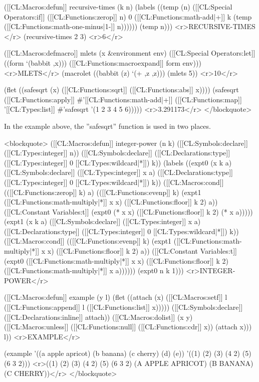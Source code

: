 ([[CL:Macros:defun]] recursive-times (k n) 
  (labels ((temp (n) ([[CL:Special Operators:if]] ([[CL:Functions:zerop]] n) 0 ([[CL:Functions:math-add|+]] k (temp ([[CL:Functions:math-one-minus|1-]] n))))))
    (temp n))) <r>RECURSIVE-TIMES </r>
(recursive-times 2 3) <r>6</r>

([[CL:Macros:defmacro]] mlets (x &environment env)
  ([[CL:Special Operators:let]] ((form `(babbit ,x)))
    ([[CL:Functions:macroexpand]] form env))) <r>MLETS</r>
(macrolet ((babbit (z) `(+ ,z ,z)))
  (mlets 5)) <r>10</r>

(flet ((safesqrt (x) ([[CL:Functions:sqrt]] ([[CL:Functions:abs]] x))))
  (safesqrt ([[CL:Functions:apply]] #'[[CL:Functions:math-add|+]] ([[CL:Functions:map]] '[[CL:Types:list]] #'safesqrt '(1 2 3 4 5 6))))) <r>3.291173</r>
</blockquote>

In the example above, the ''safesqrt'' function is used in two places. 

<blockquote>
([[CL:Macros:defun]] integer-power (n k)
  ([[CL:Symbols:declare]] ([[CL:Types:integer]] n))
  ([[CL:Symbols:declare]] ([[CL:Declarations:type]] ([[CL:Types:integer]] 0 [[CL:Types:wildcard|*]]) k))
  (labels ((expt0 (x k a)
             ([[CL:Symbols:declare]] ([[CL:Types:integer]] x a) ([[CL:Declarations:type]] ([[CL:Types:integer]] 0 [[CL:Types:wildcard|*]]) k))
             ([[CL:Macros:cond]] (([[CL:Functions:zerop]] k) a)
                   (([[CL:Functions:evenp]] k) (expt1 ([[CL:Functions:math-multiply|*]] x x) ([[CL:Functions:floor]] k 2) a))
                   ([[CL:Constant Variables:t]] (expt0 (* x x) ([[CL:Functions:floor]] k 2) (* x a)))))
           (expt1 (x k a)
             ([[CL:Symbols:declare]] ([[CL:Types:integer]] x a) ([[CL:Declarations:type]] ([[CL:Types:integer]] 0 [[CL:Types:wildcard|*]]) k))
             ([[CL:Macros:cond]] (([[CL:Functions:evenp]] k) (expt1 ([[CL:Functions:math-multiply|*]] x x) ([[CL:Functions:floor]] k 2) a))
                    ([[CL:Constant Variables:t]] (expt0 ([[CL:Functions:math-multiply|*]] x x) ([[CL:Functions:floor]] k 2) ([[CL:Functions:math-multiply|*]] x a))))))
  (expt0 n k 1))) <r>INTEGER-POWER</r>

([[CL:Macros:defun]] example (y l)
  (flet ((attach (x) ([[CL:Macros:setf]] l ([[CL:Functions:append]] l ([[CL:Functions:list]] x)))))
    ([[CL:Symbols:declare]] ([[CL:Declarations:inline]] attach))
    ([[CL:Macros:dolist]] (x y) ([[CL:Macros:unless]] ([[CL:Functions:null]] ([[CL:Functions:cdr]] x)) (attach x)))
    l)) <r>EXAMPLE</r>

(example '((a apple apricot) (b banana) (c cherry) (d) (e)) 
         '((1) (2) (3) (4 2) (5) (6 3 2)))
<r>((1) (2) (3) (4 2) (5) (6 3 2) (A APPLE APRICOT) (B BANANA) (C CHERRY))</r>
</blockquote>

